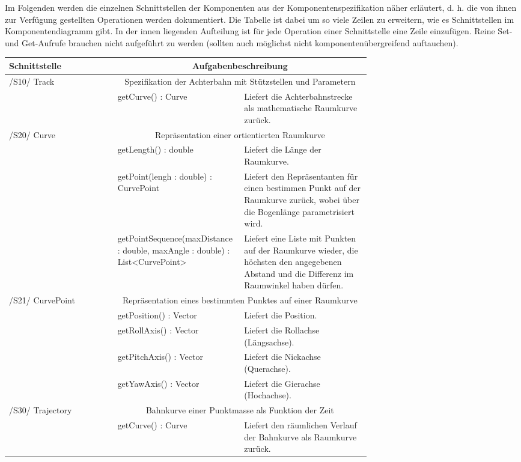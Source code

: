 Im Folgenden werden die einzelnen Schnittstellen der Komponenten aus der
Komponentenspezifikation näher erläutert, d. h. die von ihnen zur Verfügung
gestellten Operationen werden dokumentiert. Die Tabelle ist dabei um so viele
Zeilen zu erweitern, wie es Schnittstellen im Komponentendiagramm gibt. In der
innen liegenden Aufteilung ist für jede Operation einer Schnittstelle eine
Zeile einzufügen.  Reine Set- und Get-Aufrufe brauchen nicht aufgeführt zu
werden (sollten auch möglichst nicht komponentenübergreifend auftauchen).

\begin{tabular}[ht]{|l|p{0.35\linewidth}|p{0.35\linewidth}|}
 \hline
 Schnittstelle & \multicolumn{2}{|c|}{Aufgabenbeschreibung}\\
 \hline
 \hline
    /S10/ Track & \multicolumn{2}{|c|}{Spezifikation der Achterbahn mit Stützstellen und Parametern}\\
 \hline
 & getCurve() : Curve & Liefert die Achterbahnstrecke als mathematische Raumkurve zurück.\\ 
 \hline
    /S20/ Curve & \multicolumn{2}{|c|}{Repräsentation einer ortientierten Raumkurve}\\
 \hline
 & getLength() : double & Liefert die Länge der Raumkurve.\\ 
 & getPoint(lengh : double) : CurvePoint & Liefert den Repräsentanten für einen bestimmen Punkt auf der Raumkurve zurück,
 wobei über die Bogenlänge parametrisiert wird.\\ 
 & getPointSequence(maxDistance : double, maxAngle : double) : List<CurvePoint> &
 	Liefert eine Liste mit Punkten auf der Raumkurve wieder, die höchsten den angegebenen Abstand und die
 	Differenz im Raumwinkel haben dürfen. \\
 \hline
    /S21/ CurvePoint & \multicolumn{2}{|c|}{Repräsentation eines bestimmten Punktes auf einer Raumkurve}\\
 \hline
 & getPosition() : Vector & Liefert die Position. \\
 & getRollAxis() : Vector & Liefert die Rollachse (Längsachse).\\ 
 & getPitchAxis() : Vector & Liefert die Nickachse (Querachse). \\ 
 & getYawAxis() : Vector & Liefert die Gierachse (Hochachse). \\
 \hline
 	/S30/ Trajectory & \multicolumn{2}{|c|}{Bahnkurve einer Punktmasse als Funktion der Zeit}\\
 \hline
 & getCurve() : Curve & Liefert den räumlichen Verlauf der Bahnkurve als Raumkurve zurück.\\ 

\end{tabular}

